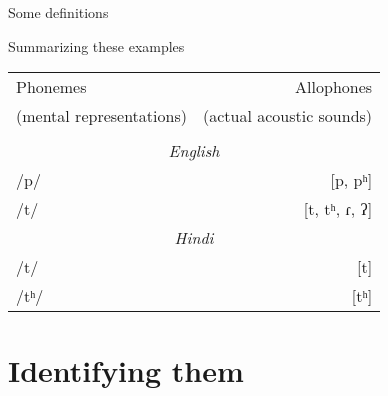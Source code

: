 \documentclass{beamer}
\newcommand{\subonethree}{Some definitions}
\begin{document}
\begin{frame}{\subonethree}
{\begin{block}{Summarizing these examples}
\begin{tabular}{l r}
            Phonemes                  & Allophones \\
            (mental representations)  & (actual acoustic sounds) \\
            \hline \\
            \multicolumn{2}{c}{\emph{English}} \\
            /p/                       & [p, pʰ] \\
            /t/                       & [t, tʰ, ɾ, ʔ] \\
            \multicolumn{2}{c}{\emph{Hindi}} \\
            /t/                       & [t] \\
            /tʰ/                      & [tʰ]
            \end{tabular}
          \end{block}
        }
      \end{frame}

  \section{Identifying them}
\end{document}

